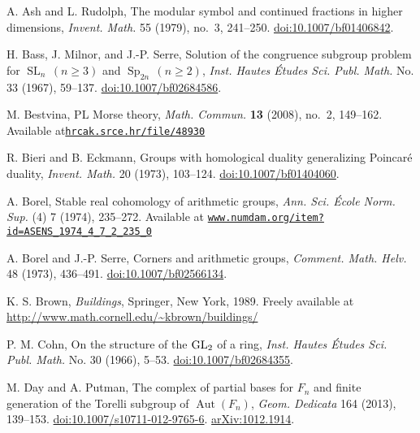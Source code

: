 \documentclass[11 pt]{article}
\theoremstyle{plain}
\theoremstyle{definition}
\numberwithin{equation}{section}
\DeclareMathOperator{\Sp}{Sp}
\DeclareMathOperator{\SL}{SL}
\DeclareMathOperator{\Aut}{Aut}
\newcommand{\arXiv}[1]{\href{http://arxiv.org/abs/#1}{arXiv:#1}}
\newcommand{\doi}[1]{\href{http://dx.doi.org/#1}{doi:#1}}
\begin{document}
\begin{thebibliography}{vdKL}
\begin{footnotesize}
\setlength{\itemsep}{1pt}


A. Ash and L. Rudolph, The modular symbol and continued fractions in higher dimensions, \emph{Invent. Math.} 55 (1979), no.~3, 241--250. \doi{10.1007/bf01406842}.

H. Bass, J. Milnor, and J.-P. Serre, Solution of the congruence subgroup problem for $\SL_n\,(n\geq 3)$ and $\Sp_{2n}\,(n\geq 2)$, \emph{Inst. Hautes \'Etudes Sci. Publ. Math.} No. 33 (1967), 59--137. \doi{10.1007/bf02684586}.

M. Bestvina, PL Morse theory, \emph{Math. Commun.} \textbf{13} (2008), no.~2, 149--162.  Available at\hfill\linebreak \href{http://hrcak.srce.hr/file/48930}{\nolinkurl{hrcak.srce.hr/file/48930}}

R. Bieri and B. Eckmann, Groups with homological duality generalizing Poincar\'e duality, \emph{Invent. Math.} 20 (1973), 103--124. \doi{10.1007/bf01404060}.

A. Borel, Stable real cohomology of arithmetic groups, \emph{Ann. Sci. \'Ecole Norm. Sup.} (4) 7 (1974), 235--272. Available at \href{http://www.numdam.org/item?id=ASENS_1974_4_7_2_235_0}{\nolinkurl{www.numdam.org/item?id=ASENS_1974_4_7_2_235_0}}

A. Borel and J.-P. Serre, Corners and arithmetic groups, \emph{Comment. Math. Helv.} 48 (1973), 436--491. \doi{10.1007/bf02566134}.

K. S. Brown, \textit{Buildings}, Springer, New York, 1989. Freely available at\newline
\url{http://www.math.cornell.edu/~kbrown/buildings/}

P. M. Cohn, On the structure of the ${\rm GL}\sb{2}$ of a ring, \emph{Inst. Hautes \'Etudes Sci. Publ. Math.} No. 30 (1966), 5--53. \doi{10.1007/bf02684355}.

M. Day and A. Putman, The complex of partial bases for $F_n$ and finite generation of the Torelli subgroup of $\Aut(F_n)$, \emph{Geom. Dedicata} 164 (2013), 139--153. \doi{10.1007/s10711-012-9765-6}. \arXiv{1012.1914}.


\end{footnotesize}
\end{thebibliography}
\end{document}
